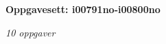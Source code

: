 \centerline{\bf Oppgavesett: i00791no-i00800no}
\vskip 10pt
\centerline{\it 10 oppgaver}\vskip 10pt
\vskip 10pt
